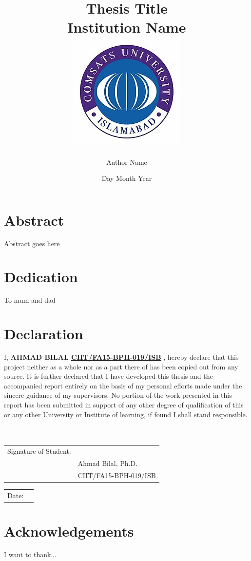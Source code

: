 \documentclass[12pt]{report}
\title{
	{Thesis Title}\\
	{\large Institution Name}\\
	{\includegraphics{university.jpg}}
}
\author{Author Name}
\date{Day Month Year}
\begin{document}
\maketitle

\chapter*{Abstract}
Abstract goes here
 
\chapter*{Dedication}
To mum and dad
 
\chapter*{Declaration}
I, \textbf{AHMAD BILAL \underline{CIIT/FA15-BPH-019/ISB}} , hereby declare that this project
neither as a whole nor as a part there of has been copied out from any source. It is
further declared that I have developed this thesis and the accompanied report entirely
on the basis of my personal efforts made under the sincere guidance of my supervisors.
No portion of the work presented in this report has been submitted in support of any
other degree of qualification of this or any other University or Institute of learning, if
found I shall stand responsible.
\\
\\
\\
\begin{flushleft}
\begin{tabular}{@{}p{1.5in}p{2in}@{}}
Signature of Student:  & \hrulefill \\
& Ahmad Bilal, Ph.D. \\
& CIIT/FA15-BPH-019/ISB\\
\end{tabular}
\end{flushleft}

\begin{flushright}
\begin{tabular}{@{}p{.25in}p{1in}@{}}
Date: & \hrulefill \\
\end{tabular}
\end{flushright}

 
\chapter*{Acknowledgements}
I want to thank...
 
\end{document}
